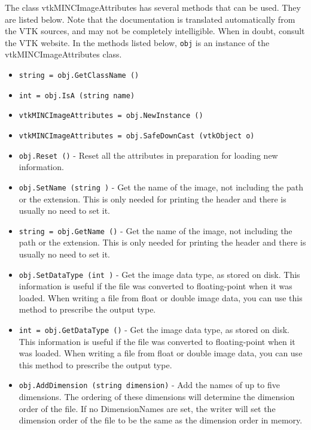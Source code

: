 The class vtkMINCImageAttributes has several methods that can be used.
  They are listed below.
Note that the documentation is translated automatically from the VTK sources,
and may not be completely intelligible.  When in doubt, consult the VTK website.
In the methods listed below, \verb|obj| is an instance of the vtkMINCImageAttributes class.
\begin{itemize}
\item  \verb|string = obj.GetClassName ()|

\item  \verb|int = obj.IsA (string name)|

\item  \verb|vtkMINCImageAttributes = obj.NewInstance ()|

\item  \verb|vtkMINCImageAttributes = obj.SafeDownCast (vtkObject o)|

\item  \verb|obj.Reset ()| -  Reset all the attributes in preparation for loading
 new information.

\item  \verb|obj.SetName (string )| -  Get the name of the image, not including the path or
 the extension.  This is only needed for printing the
 header and there is usually no need to set it.

\item  \verb|string = obj.GetName ()| -  Get the name of the image, not including the path or
 the extension.  This is only needed for printing the
 header and there is usually no need to set it.

\item  \verb|obj.SetDataType (int )| -  Get the image data type, as stored on disk.  This information
 is useful if the file was converted to floating-point when it
 was loaded.  When writing a file from float or double image data,
 you can use this method to prescribe the output type. 

\item  \verb|int = obj.GetDataType ()| -  Get the image data type, as stored on disk.  This information
 is useful if the file was converted to floating-point when it
 was loaded.  When writing a file from float or double image data,
 you can use this method to prescribe the output type. 

\item  \verb|obj.AddDimension (string dimension)| -  Add the names of up to five dimensions. The ordering of these
 dimensions will determine the dimension order of the file.  If
 no DimensionNames are set, the writer will set the dimension
 order of the file to be the same as the dimension order in memory.


\end{itemize}
